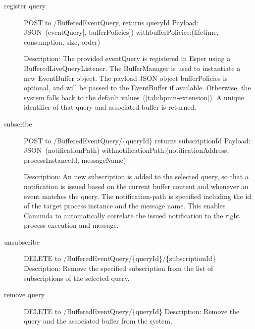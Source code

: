 \begin{description}
	\item[register query]
		POST to /BufferedEventQuery, returns queryId\newline
		Payload: JSON~(eventQuery[, bufferPolicies]) with\newline bufferPolicies:(lifetime, consumption, size, order)
		
		Description: The provided eventQuery is registered in Esper using a BufferedLiveQueryListener. The BufferManager is used to instantiate a new EventBuffer object. The payload JSON object bufferPolicies is optional, and will be passed to the EventBuffer if available. Otherwise, the system falls back to the default values~(\autoref{tab:bpmn-extension}).
		A unique identifier of that query and associated buffer is returned.
	\item[subscribe]
		POST to /BufferedEventQuery/\{queryId\}\newline
		returns subscriptionId\newline
		Payload: JSON~(notificationPath) with\newline notificationPath:(notificationAddress, processInstanceId, messageName)
		
		Description: An new subscription is added to the selected query, so that a notification is issued based on the current buffer content and whenever an event matches the query.
		The notification-path is specified including the id of the target process instance and the message name. This enables Camunda to automatically correlate the issued notification to the right process execution and message.
	\item[unsubscribe]
		DELETE to /BufferedEventQuery/\{queryId\}/\{subscriptionId\}\newline
		Description: Remove the specified subscription from the list of subscriptions of the selected query.
	\item[remove query]
		DELETE to /BufferedEventQuery/\{queryId\}\newline
		Description: Remove the query and the associated buffer from the system.
\end{description}



